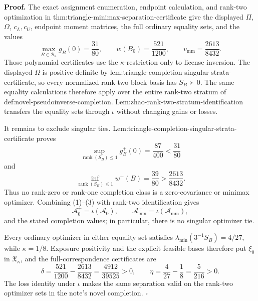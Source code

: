 \textbf{Proof.}
The exact assignment enumeration, endpoint calculation, and rank-two optimization in thm:triangle-minimax-separation-certificate give the displayed \(\Pi\), \(\Omega\), \(c_L,c_U\), endpoint moment matrices, the full ordinary equality sets, and the values
\[
\max_{B\in\mathcal B_\kappa}g_B(0)=\frac{31}{80},
\qquad
w(B_0)=\frac{521}{1200},
\qquad
v_{\mathrm{mm}}=\frac{2613}{8432}.                                  \tag{1}
\]
Those polynomial certificates use the \(\kappa\)-restriction only to license inversion.  The displayed \(\Omega\) is positive definite by lem:triangle-completion-singular-strata-certificate, so every normalized rank-two block basis has \(S_B\succ0\).  The same equality calculations therefore apply over the entire rank-two stratum of def:novel-pseudoinverse-completion.  Lem:zhao-rank-two-stratum-identification transfers the equality sets through \(\iota\) without changing gains or losses.

It remains to exclude singular ties.  Lem:triangle-completion-singular-strata-certificate proves
\[
\sup_{\operatorname{rank}(S_B)\le1}g_B^+(0)
=\frac{87}{400}<\frac{31}{80}                                       \tag{2}
\]
and
\[
\inf_{\operatorname{rank}(S_B)\le1}w^+(B)
=\frac{39}{80}>\frac{2613}{8432}.                                   \tag{3}
\]
Thus no rank-zero or rank-one completion class is a zero-covariance or minimax optimizer.  Combining (1)--(3) with rank-two identification gives
\[
\mathcal A_0^+=\iota(\mathcal A_0),
\qquad
\mathcal A_{\mathrm{mm}}^+=\iota(\mathcal A_{\mathrm{mm}}),
\]
and the stated completion values; in particular, there is no singular optimizer tie.

Every ordinary optimizer in either equality set satisfies \(\lambda_{\min}(3^{-1}S_B)=4/27\), while \(\kappa=1/8\).  Exposure positivity and the explicit feasible bases therefore put \(\xi_0\) in \(\mathfrak X_\kappa\), and the full-correspondence certificates are
\[
\delta
=\frac{521}{1200}-\frac{2613}{8432}
=\frac{4912}{39525}>0,
\qquad
\eta=\frac4{27}-\frac18=\frac5{216}>0.
\]
The loss identity under \(\iota\) makes the same separation valid on the rank-two optimizer sets in the note's novel completion. \(\square\)